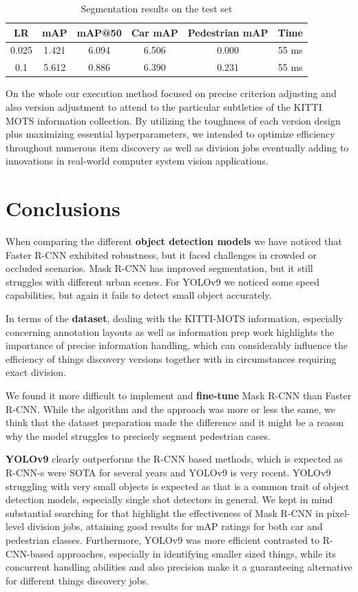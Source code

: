 \documentclass{IEEEtran}
\begin{document}
	
	\begin{table}[H]
		\centering
		\begin{tabular}{@{}cccccc@{}}
			\toprule
			\textbf{LR} & \textbf{mAP} & \textbf{mAP@50} & \textbf{Car mAP} & \textbf{Pedestrian mAP} & \textbf{Time} \\
			\midrule
			0.025 & 1.421 & 6.094 & 6.506 & 0.000 & 55 ms \\
			0.1 & 5.612 & 0.886 & 6.390 & 0.231 & 55 ms \\
			\bottomrule
		\end{tabular}
		\caption{Segmentation results on the test set}
		\label{tab:mask_test_segm_evaluation}
	\end{table}
	
	On the whole our execution method focused on precise criterion adjusting and also version adjustment to attend to the particular subtleties of the KITTI MOTS information collection. By utilizing the toughness of each version design plus maximizing essential hyperparameters, we intended to optimize efficiency throughout numerous item discovery as well as division jobs eventually adding to innovations in real-world computer system vision applications.
	
	
	\section{Conclusions}
	When comparing the different \textbf{object detection models} we have noticed that Faster R-CNN exhibited robustness, but it faced challenges in crowded or occluded scenarios. Mask R-CNN has improved segmentation, but it still struggles with different urban scenes. For YOLOv9 we noticed some speed capabilities, but again it fails to detect small object accurately. 
	
	In terms of the \textbf{dataset}, dealing with the KITTI-MOTS information, especially concerning annotation layouts as well as information prep work highlights the importance of precise information handling, which can considerably influence the efficiency of things discovery versions together with in circumstances requiring exact division.
	
	We found it more difficult to implement and \textbf{fine-tune} Mask R-CNN than Faster R-CNN. While the algorithm and the approach was more or less the same, we think that the dataset preparation made the difference and it might be a reason why the model struggles to precisely segment pedestrian cases.
	
	\textbf{YOLOv9} clearly outperforms the R-CNN based methods, which is expected as R-CNN-s were SOTA for several years and YOLOv9 is very recent. YOLOv9 struggling with very small objects is expected as that is a common trait of object detection models, especially single shot detectors in general. We kept in mind substantial searching for that highlight the effectiveness of Mask R-CNN in pixel-level division jobs, attaining good results for mAP ratings for both car and pedestrian classes. Furthermore, YOLOv9 was more efficient contrasted to R-CNN-based approaches, especially in identifying smaller sized things, while its concurrent handling abilities and also precision make it a guaranteeing alternative for different things discovery jobs.
	
\end{document}
